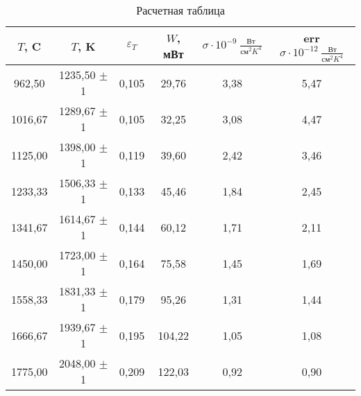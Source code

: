 \begin{table}[h!]
    \begin{tabular}{|c|c|c|c|c|c|}
    \hline
    $T$, C       & $T$, K            & $\varepsilon_T$    & $W$, мВт      & $\sigma \cdot 10^{-9} ~ \frac{\text{Вт}}{\text{см}^2 K^4}$  & err $\sigma \cdot 10^{-12} ~ \frac{\text{Вт}}{\text{см}^2 K^4}$ \\ \hline
    962,50       & 1235,50 $\pm$ 1   & 0,105              & 29,76         & 3,38                                                        & 5,47                                                            \\ \hline
    1016,67      & 1289,67 $\pm$ 1   & 0,105              & 32,25         & 3,08                                                        & 4,47                                                            \\ \hline
    1125,00      & 1398,00 $\pm$ 1   & 0,119              & 39,60         & 2,42                                                        & 3,46                                                            \\ \hline
    1233,33      & 1506,33 $\pm$ 1   & 0,133              & 45,46         & 1,84                                                        & 2,45                                                            \\ \hline
    1341,67      & 1614,67 $\pm$ 1   & 0,144              & 60,12         & 1,71                                                        & 2,11                                                            \\ \hline
    1450,00      & 1723,00 $\pm$ 1   & 0,164              & 75,58         & 1,45                                                        & 1,69                                                            \\ \hline
    1558,33      & 1831,33 $\pm$ 1   & 0,179              & 95,26         & 1,31                                                        & 1,44                                                            \\ \hline
    1666,67      & 1939,67 $\pm$ 1   & 0,195              & 104,22        & 1,05                                                        & 1,08                                                            \\ \hline
    1775,00      & 2048,00 $\pm$ 1   & 0,209              & 122,03        & 0,92                                                        & 0,90                                                            \\ \hline
    \end{tabular}
    \centering
    \caption{Расчетная таблица}
    \label{tabel:calculations}
\end{table}